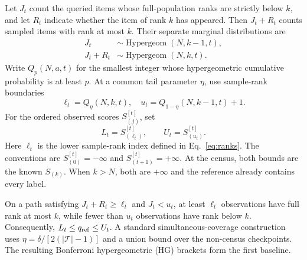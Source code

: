 \documentclass[preprint,12pt]{elsarticle}
\begin{document}
Let $J_t$ count the queried items whose full-population ranks are strictly below $k$, and let $R_t$ indicate whether the item of rank $k$ has appeared. Then $J_t+R_t$ counts sampled items with rank at most $k$. Their separate marginal distributions are
\begin{equation}
 \begin{aligned}
 J_t&\sim\operatorname{Hypergeom}(N,k-1,t),\\
 J_t+R_t&\sim\operatorname{Hypergeom}(N,k,t).
 \end{aligned}
 \label{eq:hg}
\end{equation}
Write $Q_p(N,a,t)$ for the smallest integer whose hypergeometric cumulative probability is at least $p$. At a common tail parameter $\eta$, use sample-rank boundaries
\begin{equation}
 \ell_t=Q_\eta(N,k,t),\quad
 u_t=Q_{1-\eta}(N,k-1,t)+1.
 \label{eq:ranks}
\end{equation}
For the ordered observed scores $S^{[t]}_{(j)}$, set
\begin{equation}
 L_t=S_{(\ell_t)}^{[t]},\qquad U_t=S_{(u_t)}^{[t]}.
 \label{eq:bracket}
\end{equation}
Here $\ell_t$ is the lower sample-rank index defined in Eq.~\eqref{eq:ranks}. The conventions are $S^{[t]}_{(0)}=-\infty$ and $S^{[t]}_{(t+1)}=+\infty$. At the census, both bounds are the known $S_{(k)}$. When $k>N$, both are $+\infty$ and the reference already contains every label.

On a path satisfying $J_t+R_t\ge\ell_t$ and $J_t<u_t$, at least $\ell_t$ observations have full rank at most $k$, while fewer than $u_t$ observations have rank below $k$. Consequently, $L_t\le q_{\rm ref}\le U_t$. A standard simultaneous-coverage construction uses $\eta=\delta/[2(|\mathcal T|-1)]$ and a union bound over the non-census checkpoints. The resulting Bonferroni hypergeometric (HG) brackets form the first baseline.
\end{document}
